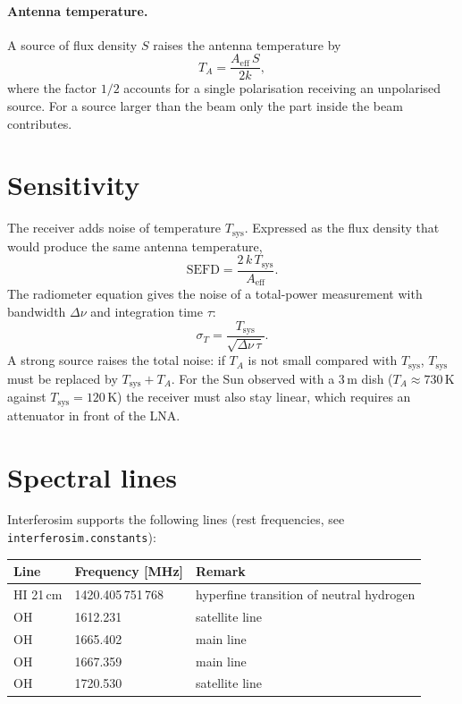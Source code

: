 \paragraph*{Antenna temperature.} A source of flux density $S$ raises
the antenna temperature by
\begin{equation}
  T_A = \frac{A_{\mathrm{eff}}\,S}{2k},
  \label{eq:ta}
\end{equation}
where the factor $1/2$ accounts for a single polarisation receiving an
unpolarised source. For a source larger than the beam only the part
inside the beam contributes.

\section{Sensitivity}

The receiver adds noise of temperature $T_{\mathrm{sys}}$. Expressed as
the flux density that would produce the same antenna temperature,
\begin{equation}
  \mathrm{SEFD} = \frac{2\,k\,T_{\mathrm{sys}}}{A_{\mathrm{eff}}} .
\end{equation}
The radiometer equation gives the noise of a total-power measurement
with bandwidth $\Delta\nu$ and integration time $\tau$:
\begin{equation}
  \sigma_T = \frac{T_{\mathrm{sys}}}{\sqrt{\Delta\nu\,\tau}} .
  \label{eq:radiometer}
\end{equation}
A strong source raises the total noise: if $T_A$ is not small compared
with $T_{\mathrm{sys}}$, $T_{\mathrm{sys}}$ must be replaced by
$T_{\mathrm{sys}} + T_A$. For the Sun observed with a 3\,m dish
($T_A \approx 730\,\mathrm{K}$ against $T_{\mathrm{sys}} = 120\,\mathrm{K}$)
the receiver must also stay linear, which requires an attenuator in
front of the LNA.

\section{Spectral lines}

Interferosim supports the following lines (rest frequencies, see
\texttt{interferosim.constants}):
\begin{center}
\begin{tabular}{@{}lll@{}}
\toprule
Line & Frequency [MHz] & Remark \\
\midrule
HI 21\,cm & 1420.405\,751\,768 & hyperfine transition of neutral hydrogen \\
OH & 1612.231 & satellite line \\
OH & 1665.402 & main line \\
OH & 1667.359 & main line \\
OH & 1720.530 & satellite line \\
\bottomrule
\end{tabular}
\end{center}
